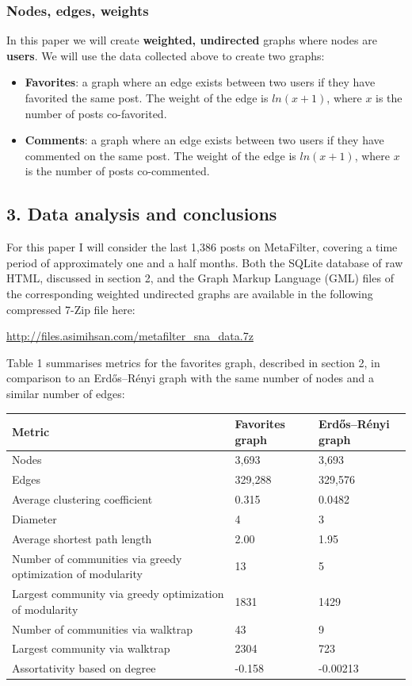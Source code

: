 \subsubsection{Nodes, edges, weights}

In this paper we will create \textbf{weighted, undirected} graphs where
nodes are \textbf{users}. We will use the data collected above to create
two graphs:

\begin{itemize}
\item
  \textbf{Favorites}: a graph where an edge exists between two users if
  they have favorited the same post. The weight of the edge is
  $ln(x+1)$, where $x$ is the number of posts co-favorited.
\item
  \textbf{Comments}: a graph where an edge exists between two users if
  they have commented on the same post. The weight of the edge is
  $ln(x+1)$, where $x$ is the number of posts co-commented.
\end{itemize}

\subsection{3. Data analysis and conclusions}

For this paper I will consider the last 1,386 posts on MetaFilter,
covering a time period of approximately one and a half months. Both the
SQLite database of raw HTML, discussed in section 2, and the Graph
Markup Language (GML) files of the corresponding weighted undirected
graphs are available in the following compressed 7-Zip file here:

\url{http://files.asimihsan.com/metafilter_sna_data.7z}

Table 1 summarises metrics for the favorites graph, described in section
2, in comparison to an Erdős--Rényi graph with the same number of nodes
and a similar number of edges:

\begin{tabular}{|l|l|l|}\hline
Metric & Favorites graph & Erdős–Rényi graph \\ \hline
Nodes  & 3,693 & 3,693 \\
Edges  & 329,288 & 329,576 \\
Average clustering coefficient & 0.315 & 0.0482 \\
Diameter & 4 & 3 \\
Average shortest path length & 2.00 & 1.95 \\
Number of communities via greedy optimization of modularity & 13 & 5 \\
Largest community via greedy optimization of modularity & 1831 & 1429 \\
Number of communities via walktrap & 43 & 9 \\
Largest community via walktrap & 2304 & 723 \\
Assortativity based on degree & -0.158 & -0.00213 \\
\end{tabular}

